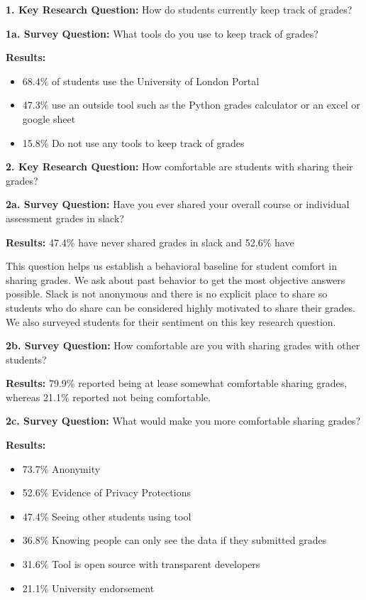 \textbf{1. Key Research Question:} How do students currently keep track of grades?
\smallskip

\textbf{1a. Survey Question:} What tools do you use to keep track of grades?
\smallskip

\textbf{Results:}
\begin{itemize}
    \item 68.4\% of students use the University of London Portal
    \item 47.3\% use an outside tool such as the Python grades calculator or an excel or google sheet
    \item 15.8\% Do not use any tools to keep track of grades
\end{itemize}


\textbf{2. Key Research Question:} How comfortable are students with sharing their grades?
\smallskip

\textbf{2a. Survey Question:} Have you ever shared your overall course or individual assessment grades in slack?
\smallskip

\textbf{Results:} 47.4\% have never shared grades in slack and 52.6\% have

This question helps us establish a behavioral baseline for student comfort in sharing grades. We ask about past behavior to get the most objective answers possible. Slack is not anonymous and there is no explicit place to share so students who do share can be considered highly motivated to share their grades. We also surveyed students for their sentiment on this key research question.
\medskip

\textbf{2b. Survey Question:} How comfortable are you with sharing grades with other students?
\smallskip

\textbf{Results:} 79.9\% reported being at lease somewhat comfortable sharing grades, whereas 21.1\% reported not being comfortable.

\textbf{2c. Survey Question:} What would make you more comfortable sharing grades?
\smallskip

\textbf{Results:}
\begin{itemize}
    \item 73.7\% Anonymity
    \item 52.6\% Evidence of Privacy Protections
    \item 47.4\% Seeing other students using tool
    \item 36.8\% Knowing people can only see the data if they submitted grades
    \item 31.6\% Tool is open source with transparent developers
    \item 21.1\% University endorsement
\end{itemize}

